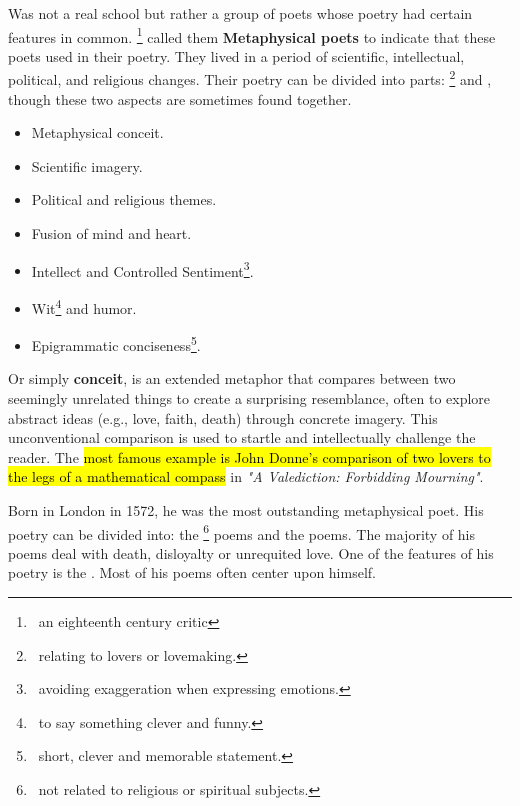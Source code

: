 
Was not a real school but rather a group of poets whose poetry
had certain features in common. \footnote{\, an eighteenth century critic}
called them \textbf{Metaphysical poets} to indicate that these poets used  in their poetry. They lived in a period of scientific, intellectual, political, and religious 
changes. Their poetry can be divided into parts: \footnote{\, relating to lovers or lovemaking.} 
and , though these two aspects are sometimes found together.


\begin{itemize}
  \item Metaphysical conceit.
  \item Scientific imagery.
  \item Political and religious themes.
  \item Fusion of mind and heart.
  \item Intellect and Controlled Sentiment\footnote{\, avoiding exaggeration when expressing emotions.}.
  \item Wit\footnote{\, to say something clever and funny.} and humor.
  \item Epigrammatic conciseness\footnote{\, short, clever and memorable statement.}.
\end{itemize}


Or simply \textbf{conceit}, is an extended metaphor that compares between two
seemingly unrelated things to create a surprising resemblance, often to explore 
abstract ideas (e.g., love, faith, death) through concrete imagery.
This unconventional comparison is used to startle and intellectually challenge the reader.
The \hl{most famous example is John Donne's comparison of
two lovers to the legs of a mathematical compass} in \textit{"A Valediction: Forbidding Mourning"}.


Born in London in 1572, he was the most outstanding metaphysical poet. His poetry can be divided into: 
the \footnote{\, not related to religious or spiritual subjects.}
poems and the  poems. The majority of his poems deal with 
death, disloyalty or unrequited love. One of the features of his poetry is the . Most of his poems often center upon himself.


